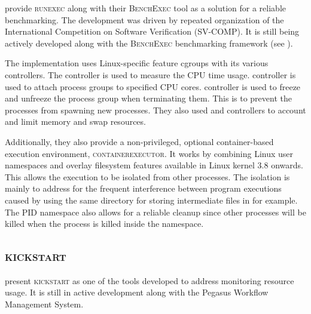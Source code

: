 \citet{beyerReliableBenchmarkingRequirements2019} provide \textsc{runexec} along with their \textsc{BenchExec} tool as a solution for a reliable benchmarking.
The development was driven by repeated organization of the International Competition on Software Verification (SV-COMP).
It is still being actively developed along with the \textsc{BenchExec} benchmarking framework (see ).

The implementation uses Linux-specific feature cgroups with its various controllers.
The  controller is used to measure the CPU time usage.
 controller is used to attach process groups to specified CPU cores.
 controller is used to freeze and unfreeze the process group when terminating them.
This is to prevent the processes from spawning new processes.
They also used  and  controllers to account and limit memory and swap resources.


Additionally, they also provide a non-privileged, optional container-based execution environment, \textsc{containerexecutor}.
It works by combining Linux user namespaces and overlay filesystem features available in Linux kernel 3.8 onwards.
This allows the execution to be isolated from other processes.
The isolation is mainly to address for the frequent interference between program executions caused by using the same directory for storing intermediate files in  for example.
The PID namespace also allows for a reliable cleanup since other processes will be killed when the  process is killed inside the namespace.


\subsection{\textsc{kickstart}}

\citet{juvePracticalResourceMonitoring2015} present \textsc{kickstart} \citep[part of][]{PegasusWorkflowManagement2019} as one of the tools developed to address monitoring resource usage.
It is still in active development along with the Pegasus Workflow Management System.

